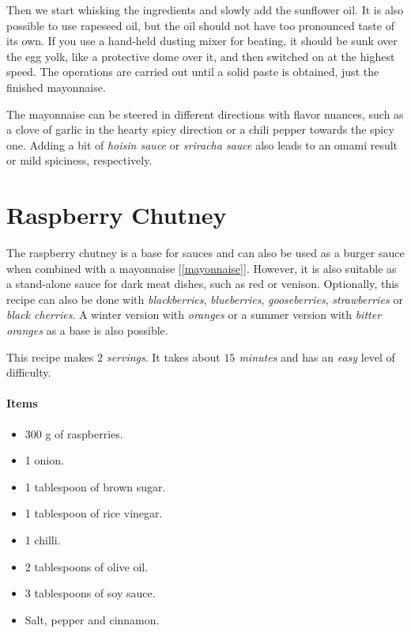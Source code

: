 Then we start whisking the ingredients and slowly add the sunflower oil. It is also possible to use rapeseed oil, but the oil should not have too pronounced taste of its own. If you use a hand-held dusting mixer for beating, it should be sunk over the egg yolk, like a protective dome over it, and then switched on at the highest speed. The operations are carried out until a solid paste is obtained, just the finished mayonnaise.

The mayonnaise can be steered in different directions with flavor nuances, such as a clove of garlic in the hearty spicy direction or a chili pepper towards the spicy one. Adding a bit of \emph{hoisin sauce} or \emph{sriracha sauce} also leads to an omami result or mild spiciness, respectively.

\section{Raspberry Chutney}
\label{raspberrychuttney}
The raspberry chutney is a base for sauces and can also be used as a burger sauce when combined with a mayonnaise [\ref{mayonnaise}]. However, it is also suitable as a stand-alone sauce for dark meat dishes, such as red or venison. Optionally, this recipe can also be done with \emph{blackberries}, \emph{blueberries}, \emph{gooseberries}, \emph{strawberries} or \emph{black cherries}. A winter version with \emph{oranges} or a summer version with \emph{bitter oranges} as a base is also possible.

This recipe makes \emph{$2$ servings}. It takes about \emph{$15$ minutes} and has an \emph{easy} level of difficulty. 

\paragraph{Items}
\begin{itemize}[noitemsep]
    \item[\ding{182}] $300$ g of raspberries.
    \item[\ding{183}] 1 onion.
    \item[\ding{184}] 1 tablespoon of brown sugar.
    \item[\ding{185}] 1 tablespoon of rice vinegar.
    \item[\ding{186}] 1 chilli.
    \item[\ding{187}] 2 tablespoons of olive oil.
    \item[\ding{188}] 3 tablespoons of soy sauce.
    \item[\ding{189}] Salt, pepper and cinnamon.
\end{itemize}

